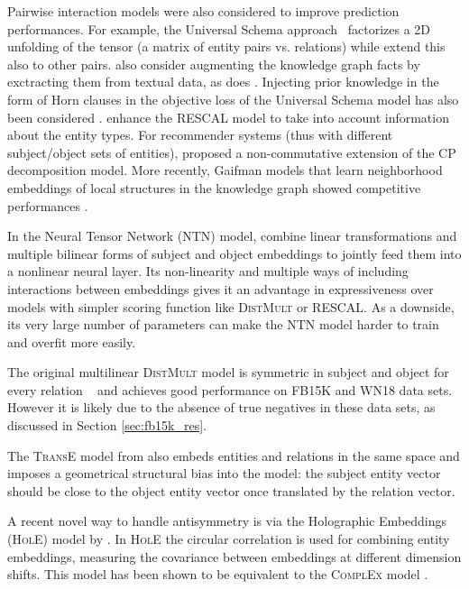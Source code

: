 \documentclass[twoside,11pt]{article}
\renewcommand{\cite}{\citep}
\begin{document}
Pairwise interaction models were also considered to improve prediction performances. For example, the Universal Schema approach~\cite{riedel_2013_univschema} factorizes a 2D unfolding of the tensor (a matrix of entity pairs vs. relations) while \citet{Welbl2016} extend this also to other pairs.
\citet{riedel_2013_univschema} also consider augmenting the knowledge graph facts 
by exctracting them from textual data,
as does \citet{Toutanova2015}. Injecting prior knowledge in the form 
of Horn clauses in the objective loss of the Universal Schema model has also been considered \cite{Rocktaschel2015}. \citet{Chang2014} enhance the RESCAL model to take
into account information about the entity types. 
For recommender systems (thus with different subject/object sets of entities), \citet{baruch2014ternary} proposed a non-commutative
extension of the CP decomposition model.
More recently, Gaifman models that learn neighborhood embeddings of local
structures in the knowledge graph showed competitive performances
\cite{niepert2016discriminative}.

In the Neural Tensor Network (NTN) model, \citet{socher2013reasoning} combine linear transformations and multiple bilinear forms of subject and object embeddings to jointly feed them into a nonlinear neural layer. Its non-linearity and multiple ways of including interactions between embeddings gives it an advantage in expressiveness over models with simpler scoring function like \textsc{DistMult} or RESCAL. As a downside, its very large number of parameters can make the NTN model harder to train and overfit more easily.

The original multilinear \textsc{DistMult} model is symmetric in subject and object for every relation ~\cite{Yang2015} and achieves good performance on FB15K and WN18 data sets. However it is likely due
to the absence of true negatives in these data sets, as discussed in Section \ref{sec:fb15k_res}.

The \textsc{TransE} model from \citet{bordes2013translating} also embeds entities and relations in the same space and imposes a geometrical structural bias into the model: the subject entity vector should be close to the object entity vector once translated by the relation vector.



A recent novel way to handle antisymmetry is via the Holographic Embeddings (\textsc{HolE}) model by \citet{nickel_2016_holographic}. In \textsc{HolE} the circular correlation is used for combining entity embeddings, measuring the covariance between embeddings at different dimension shifts. This model has been shown to be equivalent to the \textsc{ComplEx} model \cite{hayashi2017equivalence,trouillon2017comparison}.
\end{document}
